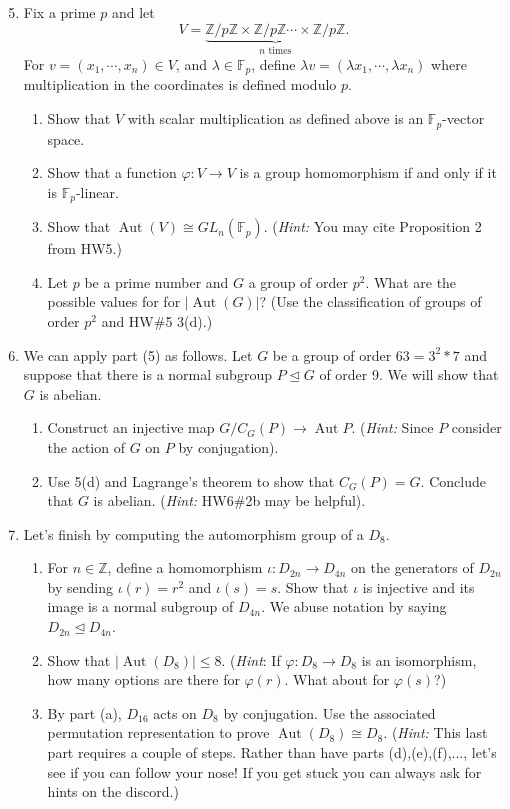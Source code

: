 \documentclass[11pt]{article}
\newcommand{\Aut}{\operatorname{Aut}}
\newcommand{\bF}{\mathbb{F}}
\newcommand{\bZ}{\mathbb{Z}}
\begin{document}
\begin{enumerate}
  \setcounter{enumi}{4}
  \item Fix a prime $p$ and let
  \[V = \underbrace{\bZ/p\bZ\times\bZ/p\bZ\cdots\times\bZ/p\bZ}_{n\text{ times}}.\]
  For $v = (x_1,\cdots,x_n)\in V$, and $\lambda\in\bF_p$, define $\lambda v = (\lambda x_1,\cdots,\lambda x_n)$ where multiplication in the coordinates is defined modulo $p$.
  \begin{enumerate}
    \item Show that $V$ with scalar multiplication as defined above is an $\bF_p$-vector space.
    \item Show that a function $\varphi:V\to V$ is a group homomorphism if and only if it is $\bF_p$-linear.
    \item Show that $\Aut(V)\cong GL_n(\bF_p)$.  (\textit{Hint:} You may cite Proposition 2 from HW5.)
    \item Let $p$ be a prime number and $G$ a group of order $p^2$.  What are the possible values for for $|\Aut(G)|$?  (Use the classification of groups of order $p^2$ and HW\#5 3(d).)
  \end{enumerate}
  \item We can apply part (5) as follows.  Let $G$ be a group of order $63 = 3^2*7$ and suppose that there is a normal subgroup $P\unlhd G$ of order 9.  We will show that $G$ is abelian.
  \begin{enumerate}
    \item Construct an injective map $G/C_G(P)\to\Aut P$.  (\textit{Hint:} Since $P$ consider the action of $G$ on $P$ by conjugation).
    \item Use 5(d) and Lagrange's theorem to show that $C_G(P) = G$.  Conclude that $G$ is abelian.  (\textit{Hint:} HW6\#2b may be helpful).
  \end{enumerate}
  \item Let's finish by computing the automorphism group of a $D_8$.
  \begin{enumerate}
    \item For $n\in\bZ$, define a homomorphism $\iota:D_{2n}\to D_{4n}$ on the generators of $D_{2n}$ by sending $\iota(r)=r^2$ and $\iota(s)=s$.  Show that $\iota$ is injective and its image is a normal subgroup of $D_{4n}$.  We abuse notation by saying $D_{2n}\unlhd D_{4n}$.
    \item Show that $|\Aut(D_8)|\le 8$.  (\textit{Hint}: If $\varphi:D_8\to D_8$ is an isomorphism, how many options are there for $\varphi(r)$.  What about for $\varphi(s)$?)
    \item By part (a), $D_{16}$ acts on $D_8$ by conjugation.  Use the associated permutation representation to prove $\Aut(D_8) \cong D_8$.  (\textit{Hint:} This last part requires a couple of steps.  Rather than have parts (d),(e),(f),..., let's see if you can follow your nose!  If you get stuck you can always ask for hints on the discord.)
  \end{enumerate}
\end{enumerate}
\end{document}
